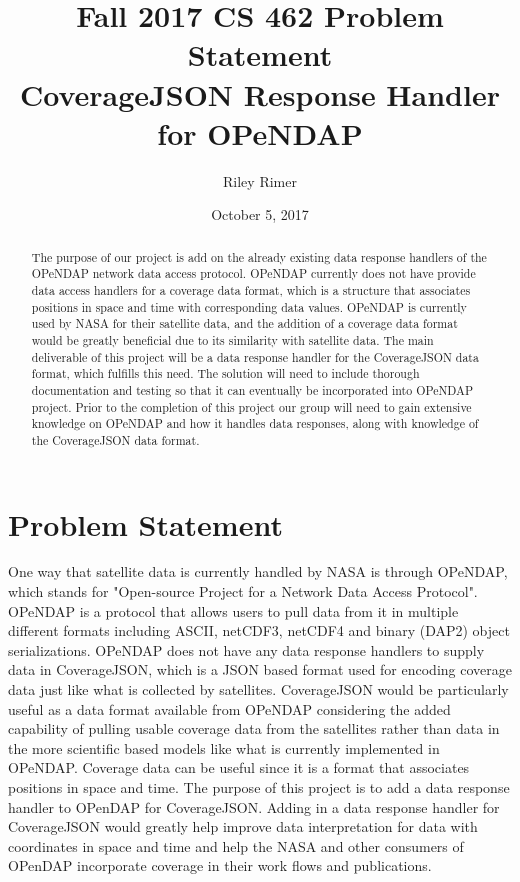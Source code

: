 \documentclass[letterpaper,10pt,draftclsnofoot,onecolumn]{IEEEtran}
\title{
Fall 2017 CS 462 Problem Statement\\
\large CoverageJSON Response Handler for OPeNDAP
}
\author{Riley Rimer}
\date{October 5, 2017}
\begin{document}
\begin{titlepage}

\maketitle
\centering

\begin{abstract}
The purpose of our project is add on the already existing data response handlers of the OPeNDAP network data access protocol. OPeNDAP currently does not have provide data access handlers for a coverage data format, which is a structure that associates positions in space and time with corresponding data values. OPeNDAP is currently used by NASA for their satellite data, and the addition of a coverage data format would be greatly beneficial due to its similarity with satellite data. The main deliverable of this project will be a data response handler for the CoverageJSON data format, which fulfills this need. The solution will need to include thorough documentation and testing so that it can eventually be incorporated into OPeNDAP project. Prior to the completion of this project our group will need to gain extensive knowledge on OPeNDAP and how it handles data responses, along with knowledge of the CoverageJSON data format.
\end{abstract}

\end{titlepage}

\section{Problem Statement}
One way that satellite data is currently handled by NASA is through OPeNDAP, which stands for "Open-source Project for a Network Data Access Protocol". OPeNDAP is a protocol that allows users to pull data from it in multiple different formats including ASCII, netCDF3, netCDF4 and binary (DAP2) object serializations. OPeNDAP does not have any data response handlers to supply data in CoverageJSON, which is a JSON based format used for encoding coverage data just like what is collected by satellites. CoverageJSON would be particularly useful as a data format available from OPeNDAP considering the added capability of pulling usable coverage data from the satellites rather than data in the more scientific based models like what is currently implemented in OPeNDAP. Coverage data can be useful since it is a format that associates positions in space and time. The purpose of this project is to add a data response handler to OPenDAP for CoverageJSON. Adding in a data response handler for CoverageJSON would greatly help improve data interpretation for data with coordinates in space and time and help the NASA and other consumers of OPenDAP incorporate coverage in their work flows and publications.
\end{document}
